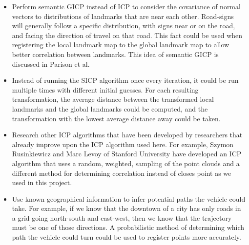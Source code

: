 \documentclass[letterpaper, 10 pt, conference]{ieeeconf}  %
\begin{document}
\begin{itemize}
\item Perform semantic GICP instead of ICP to consider the covariance of normal vectors to distributions of landmarks that are near each other. Road-signs will generally follow a specific distribution, with signs near or on the road, and facing the direction of travel on that road. This fact could be used when registering the local landmark map to the global landmark map to allow better correlation between landmarks. This idea of semantic GICP is discussed in Parison et al. \cite{cGICP}
\item Instead of running the SICP algorithm once every iteration, it could be run multiple times with different initial guesses. For each resulting transformation, the average distance between the transformed local landmarks and the global landmarks could be computed, and the transformation with the lowest average distance away could be taken.
\item Research other ICP algorithms that have been developed by researchers that already improve upon the ICP algorithm used here. For example, Szymon Rusinkiewicz and Marc Levoy of Stanford University \cite{ref:futurework} have developed an ICP algorithm that uses a random, weighted, sampling of the point clouds and a different method for determining correlation instead of closes point as we used in this project.
\item Use known geographical information to infer potential paths the vehicle could take. For example, if we know that the downtown of a city has only roads in a grid going north-south and east-west, then we know that the trajectory must be one of those directions. A probabilistic method of determining which path the vehicle could turn could be used to register points more accurately.
\end{itemize}



\addtolength{\textheight}{-12cm}   %

\end{document}
